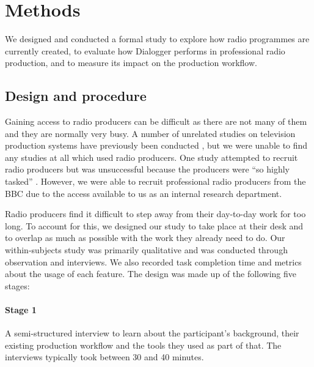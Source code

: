 
\section{Methods}\label{sec:methods}
We designed and conducted a formal study to explore how radio programmes are
currently created, to evaluate how Dialogger performs in professional radio
production, and to measure its impact on the production workflow. 

\subsection{Design and procedure}
Gaining access to radio producers can be difficult as there are not many of
them and they are normally very busy. A number of unrelated
studies on television production systems have previously been conducted
\citep{Engstroem2010,Perry2009}, but we were unable to find any studies at all
which used radio producers. One study attempted to recruit radio producers but
was unsuccessful because the producers were ``so highly tasked''
\citep{Kim2003}. However, we were able to recruit professional radio producers
from the BBC due to the access available to us as an internal research
department.

Radio producers find it difficult to step away from their day-to-day work for
too long. To account for this, we designed our study to take place at their
desk and to overlap as much as possible with the work they already need to do.
Our within-subjects study was primarily qualitative and was conducted through
observation and interviews. We also recorded task completion time and metrics
about the usage of each feature. The design was made up of the following five
stages:

\paragraph{Stage 1}
    A semi-structured interview to learn about the participant's
    background, their existing production workflow and the tools they used as
    part of that. The interviews typically took between 30 and 40 minutes.

